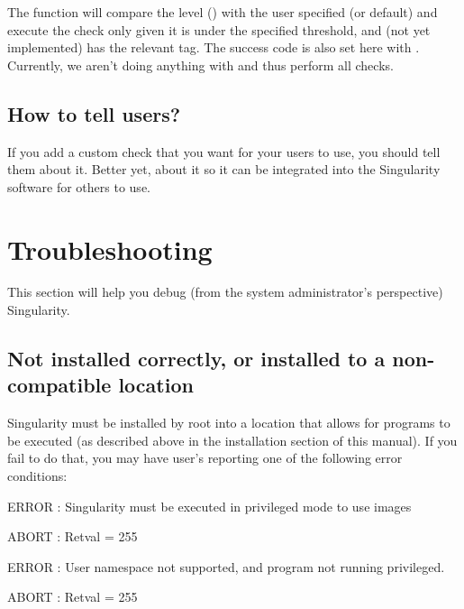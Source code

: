 \documentclass[letterpaper,10pt,english]{sphinxmanual}
\begin{document}
The function  will compare the level (\sphinxcode{\sphinxupquote{{[}LEVEL{]}}}) with the user specified (or
default)  and execute the check only given it is under the specified
threshold, and (not yet implemented) has the relevant tag. The success
code is also set here with \sphinxcode{\sphinxupquote{{[}SUCCESS{]}}}. Currently, we aren’t doing anything with \sphinxcode{\sphinxupquote{{[}TAGS{]}}}
and thus perform all checks.


\section{How to tell users?}
\label{\detokenize{container_checks:how-to-tell-users}}
If you add a custom check that you want for your users to use, you
should tell them about it. Better yet,  about it
so it can be integrated into the Singularity software for others to use.


\chapter{Troubleshooting}
\label{\detokenize{troubleshooting:troubleshooting}}\label{\detokenize{troubleshooting::doc}}
This section will help you debug (from the system administrator’s
perspective) Singularity.


\section{Not installed correctly, or installed to a non-compatible location}
\label{\detokenize{troubleshooting:not-installed-correctly-or-installed-to-a-non-compatible-location}}
Singularity must be installed by root into a location that allows for
 programs to be executed (as described above in the installation
section of this manual). If you fail to do that, you may have user’s
reporting one of the following error conditions:

%
\begin{sphinxVerbatim}[commandchars=\\\{\}]
ERROR  : Singularity must be executed in privileged mode to use images

ABORT  : Retval = 255
\end{sphinxVerbatim}

%
\begin{sphinxVerbatim}[commandchars=\\\{\}]
ERROR  : User namespace not supported, and program not running privileged.

ABORT  : Retval = 255
\end{sphinxVerbatim}
\end{document}
